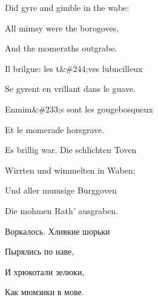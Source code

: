 \documentclass[../main.tex]{subfiles}
\begin{document}
Did gyre and gimble in the wabe:

All mimsy were the borogoves,

And the momeraths outgrabe.

Il brilgue: les t\&\#244;ves lubncilleux

Se gyrent en vrillant dans le guave.

Enmim\&\#233;s sont les gougebosqueux

Et le momerade horsgrave.

Es brillig war. Die schlichten Toven

Wirrten und wimmelten in Waben;

Und aller mumsige Burggoven

Die mohmen Rath' ausgraben.

Воркалось. Хливкие шорьки

Пырялись по наве,

И хрюкотали зелюки,

Как мюмзики в мове.
\end{document}
